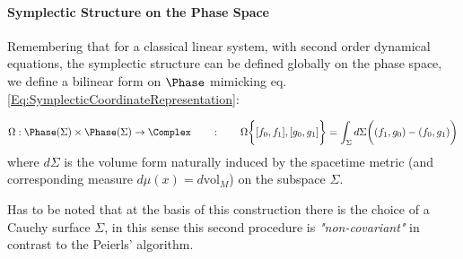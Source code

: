 \documentclass[Main]{subfiles}
\begin{document}
		\paragraph{Symplectic Structure on the Phase Space}
			Remembering that for a classical linear system, with second order dynamical equations, the symplectic structure can be defined globally on the phase space, we define a bilinear form on $\Phase$ mimicking eq. \ref{Eq:SymplecticCoordinateRepresentation}:
			\begin{definition}\label{Def:InitialDataSymplecticForm}
				\begin{displaymath}
					\Omega: \Phase(\Sigma) \times \Phase(\Sigma) \rightarrow \Complex \qquad : \qquad 					
					\Omega \biggr\{ [f_0,f_1] , [g_0, g_1] \biggr\} = \int_\Sigma d\Sigma \biggr( (f_1,g_0)  - ( f_0, g_1) \biggr)
				\end{displaymath}
				where $d\Sigma$ is the volume form naturally induced by the spacetime metric (and corresponding measure $d\mu(x)= d\textrm{vol}_M$) on the subspace $\Sigma$.
			\end{definition}			
			
			Has to be noted that at the basis of this construction there is the choice of a Cauchy surface $\Sigma$, in this sense this second procedure is \emph{"non-covariant"} in contrast to the Peierls' algorithm.
				
\end{document}
